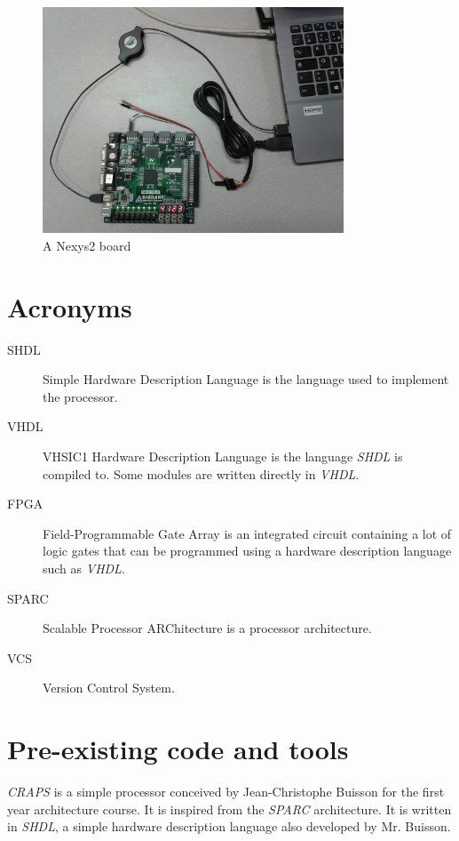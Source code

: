 \documentclass[openany, a4paper]{book}
\begin{document}
      \begin{figure}[h]
        \centering
        \includegraphics[width=0.8\textwidth]{./fig/Nexys2.jpg}
        \caption{A Nexys2 board}
        \label{fig:nexys}
      \end{figure}

    \section{Acronyms}
      \begin{description}
        \item[SHDL] Simple Hardware Description Language is the language used to
          implement the processor.
        \item[VHDL] VHSIC1 Hardware Description Language is the language
          \emph{SHDL} is compiled to. Some modules are written directly in
          \emph{VHDL}.
        \item[FPGA] Field-Programmable Gate Array is an integrated circuit
          containing a lot of logic gates that can be programmed using a
          hardware description language such as \emph{VHDL}.
        \item[SPARC] Scalable Processor ARChitecture is a processor
          architecture.
        \item[VCS] Version Control System.
      \end{description}

    \section{Pre-existing code and tools}
      \emph{CRAPS} is a simple processor conceived by Jean-Christophe Buisson for the
      first year architecture course. It is inspired from the \emph{SPARC}
      architecture. It is written in \emph{SHDL}, a simple hardware description
      language also developed by Mr. Buisson.
\end{document}
